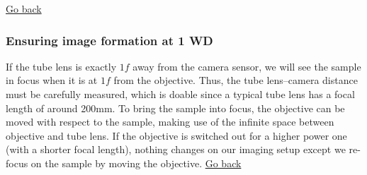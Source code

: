 \documentclass[a4paper]{report}
\begin{document}
   \noindent
   \hyperlink{hintBack-imaging}{Go back}

\subsubsection{Ensuring image formation at 1 WD}
If the tube lens is exactly $1f$ away from the camera sensor, we will see the sample in focus when it is at $1f$ from the objective.
Thus, the tube lens--camera distance must be carefully measured, which is doable since a typical tube lens has a focal length of around 200mm.
To bring the sample into focus, the objective can be moved with respect to the sample, making use of the infinite space between objective and tube lens.
If the objective is switched out for a higher power one (with a shorter focal length), nothing changes on our imaging setup except we re-focus on the sample by moving the objective.
\noindent
\hyperlink{hintBack-imaging}{Go back}
\clearpage
\end{document}

